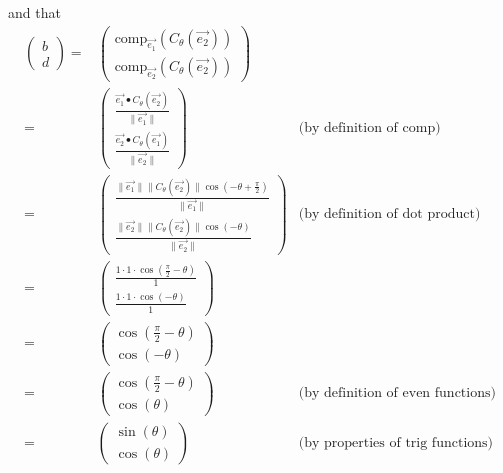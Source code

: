 \documentclass[12pt]{article}
\newenvironment{problem}[2][Problem]
{
	\begin{trivlist} 
		\item[\hskip \labelsep {\bfseries #1 #2:}]
	}
{
	\end{trivlist}
	}
\begin{document}
\begin{problem}{6}
\newpage
\noindent
and that
\begin{align*}
\begin{pmatrix}b\\d\end{pmatrix} =&\begin{pmatrix}\text{comp}_{\vec{e_{1}}}(C_{\theta}(\vec{e_{2}}))\\ \text{comp}_{\vec{e_{2}}}(C_{\theta}(\vec{e_{2}})) \end{pmatrix} &\\
=&\begin{pmatrix} \frac{\vec{e_{1}} \bullet C_{\theta}(\vec{e_{2}})}{\| \vec{e_{1}} \|} \\ \frac{\vec{e_{2}} \bullet C_{\theta}(\vec{e_{1}})}{\| \vec{e_{2}} \|} \end{pmatrix} &\text{(by definition of comp)} \\
=& \begin{pmatrix} \frac{\| \vec{e_{1}} \| \| C_{\theta}(\vec{e_{2}}) \| \cos (-\theta + \frac{\pi}{2})}{\| \vec{e_{1}} \|} \\ \frac{\| \vec{e_{2}} \| \| C_{\theta}(\vec{e_{2}}) \| \cos(-\theta)}{\| \vec{e_{2}} \|} \end{pmatrix} & \text{(by definition of dot product)}\\
=& \begin{pmatrix} \frac{1 \cdot 1 \cdot \cos (\frac{\pi}{2} -\theta)}{1} \\ \frac{1 \cdot 1 \cdot \cos (-\theta)}{1} \end{pmatrix} &\\
=& \begin{pmatrix} \cos (\frac{\pi}{2} -\theta)\\ \cos (-\theta) \end{pmatrix} & \\
=&  \begin{pmatrix} \cos (\frac{\pi}{2} -\theta)\\ \cos (\theta) \end{pmatrix} & \text{(by definition of even functions)}\\
=& \begin{pmatrix} \sin (\theta)\\ \cos (\theta) \end{pmatrix} & \text{(by properties of trig functions)}
\end{align*}

\end{problem}
\end{document}
